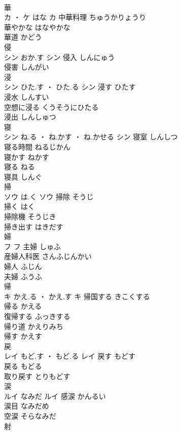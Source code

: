 \documentclass[8pt]{extreport}
\begin{document}
\begin{CJK}{UTF8}{min}
\\	華	
\\	カ ・ ケ	はな	カ	中華料理	ちゅうかりょうり	
\\	華やかな	はなやかな	
\\	華道	かどう	
\\	侵	
\\	シン	おか.す	シン	侵入	しんにゅう	
\\	侵害	しんがい	
\\	浸	
\\	シン	ひた.す ・ ひた.る	シン	浸す	ひたす	
\\	浸水	しんすい	
\\	空想に浸る	くうそうにひたる	
\\	浸出	しんしゅつ	
\\	寝	
\\	シン	ね.る ・ ね.かす ・ ね.かせる	シン	寝室	しんしつ	
\\	寝る時間	ねるじかん	
\\	寝かす	ねかす	
\\	寝る	ねる	
\\	寝具	しんぐ	
\\	掃	
\\	ソウ	は.く	ソウ	掃除	そうじ	
\\	掃く	はく	
\\	掃除機	そうじき	
\\	掃き出す	はきだす	
\\	婦	
\\	フ		フ	主婦	しゅふ	
\\	産婦人科医	さんふじんかい	
\\	婦人	ふじん	
\\	夫婦	ふうふ	
\\	帰	
\\	キ	かえ.る ・ かえ.す	キ	帰国する	きこくする	
\\	帰る	かえる	
\\	復帰する	ふっきする	
\\	帰り道	かえりみち	
\\	帰す	かえす	
\\	戻	
\\	レイ	もど.す ・ もど.る	レイ	戻す	もどす	
\\	戻る	もどる	
\\	取り戻す	とりもどす	
\\	涙	
\\	ルイ	なみだ	ルイ	感涙	かんるい	
\\	涙目	なみだめ	
\\	空涙	そらなみだ	
\\	射	

\end{CJK}
\end{document}
